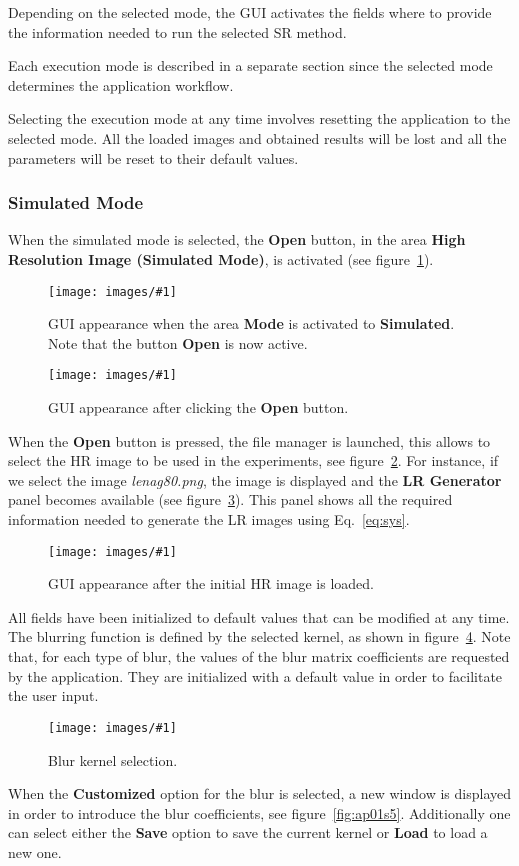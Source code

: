 \documentclass[11pt,a4paper]{article}
\newcommand{\figureimage}[4]{%
\begin{figure}[t]%
\begin{center}%
\texttt{[image: images/\#1]}%
\caption{#4}%
\label{#3}%
\end{center}%
\end{figure}%
} %
\newcommand{\new}[1]{#1} %
\begin{document}
Depending on the selected mode, the GUI activates the fields where to provide the information needed to run the selected SR method.

Each execution mode is described in a separate section since the selected mode determines the application workflow.


\new{Selecting the execution mode at any time involves resetting the application to the selected mode. All the loaded images and obtained results will be lost and all the parameters will be reset to their default values.}


\subsubsection{Simulated Mode}

When the simulated mode is selected, the \textbf{Open} button, in the area \textbf{High Resolution Image (Simulated Mode)}, is activated (see figure~\ref{fig:ap01s1}).

\figureimage{s1}{width=1.0\textwidth}{fig:ap01s1}%
 {GUI appearance when the area \textbf{Mode} is activated to \textbf{Simulated}. Note that the button \textbf{Open} is now active.}

\figureimage{s2}{width=1.0\textwidth}{fig:ap01s2}%
 {GUI appearance after clicking the \textbf{Open} button.}
 
When the \textbf{Open} button is pressed, the file manager is launched, this allows to select the HR image to be used in the experiments, see figure~\ref{fig:ap01s2}. For instance, if we select the image \textit{lenag80.png}, the image is displayed and the  \textbf{LR Generator} panel becomes  available  (see figure~\ref{fig:ap01s3}). This panel shows all the required information needed to generate the LR images using Eq.~\eqref{eq:sys}. 

\figureimage{s3}{width=1.0\textwidth}{fig:ap01s3}%
 {GUI appearance after the initial HR image is loaded.}

All fields have been initialized to default values that can be modified at any time. The blurring function is defined by the selected kernel, as shown in figure~\ref{fig:ap01s4}. Note that, for each type of blur, the values of the blur matrix coefficients are requested by the application. They are initialized with a default value in order to facilitate the user input.

\figureimage{s4}{width=0.75\textwidth}{fig:ap01s4}%
 {Blur kernel selection.}

When the \textbf{Customized} option for the blur is selected, a new window is displayed in order to introduce the blur coefficients, see figure~\ref{fig:ap01s5}. Additionally one can select either the \textbf{Save} option to save the current kernel or \textbf{Load} to load a new one.
 
\end{document}
